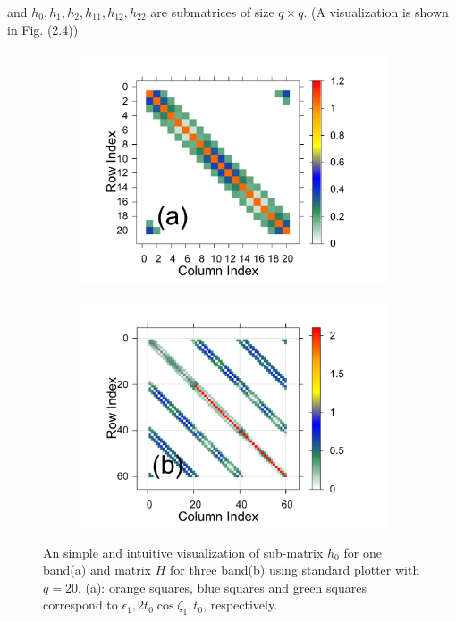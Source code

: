 \documentclass{report}
\begin{document}
and $h_{0},h_{1},h_{2},h_{11},h_{12},h_{22}$ are submatrices of size $q \times q$. (A visualization is shown in Fig. (2.4))
\begin{figure}[htb]
	\centering
	\begin{subfigure}[b]{0.495\textwidth}
		\centering
		\includegraphics[width=1.23\textwidth,height=0.95\textwidth]{pic/matrix_1band_h0_q_20.pdf}
		\label{fig:3 band matrix}
	\end{subfigure}
	\begin{subfigure}[b]{0.495\textwidth}
		\centering
		\includegraphics[width=1.23\textwidth,height=0.95\textwidth]{pic/matrix_3band_h0_q_20.pdf}
		\label{fig:1 band matrix}
	\end{subfigure}
	\caption{
		An simple and intuitive visualization of sub-matrix $h_{0}$ for one band(a) and matrix $H$ for three band(b) using standard plotter with $q = 20$. (a): orange squares, blue squares and green squares correspond to $\epsilon_{1}, 2 t_{0} \cos \zeta_{1}, t_{0}$, respectively.
	}
\end{figure}
\end{document}
